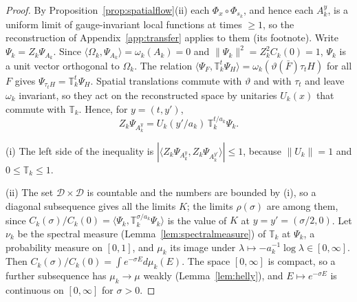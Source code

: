 \documentclass[aps,prd,twocolumn,superscriptaddress,nofootinbib,longbibliography,floatfix,amsmath,amssymb,10pt]{revtex4-2}
\theoremstyle{definition}
\theoremstyle{remark}
\newcommand{\ip}[2]{\langle #1,#2\rangle}
\begin{document}
\begin{proof}
By Proposition~\ref{prop:spatialflow}(ii) each $\Phi_x\circ\Phi_{s_k}$, and
hence each $A^y_k$, is a uniform limit of gauge-invariant local functions at
times $\ge1$, so the reconstruction of Appendix~\ref{app:transfer} applies to
them (its footnote). Write $\Psi_k=Z_k\Psi_{A_k}$. Since
$\ip{\Omega_k}{\Psi_{A_k}}=\omega_k(A_k)=0$ and $\|\Psi_k\|^2=Z_k^2C_k(0)=1$,
$\Psi_k$ is a unit vector orthogonal to $\Omega_k$. The relation
$\ip{\Psi_F}{\mathbb T_k^t\Psi_H}=\omega_k(\vartheta(\bar F)\tau_tH)$ for all $F$
gives $\Psi_{\tau_tH}=\mathbb T_k^t\Psi_H$. Spatial translations commute with
$\vartheta$ and with $\tau_t$ and leave $\omega_k$ invariant, so they act on the
reconstructed space by unitaries $U_k(x)$ that commute with $\mathbb T_k$.
Hence, for $y=(t,y')$,
\[
Z_k\Psi_{A^y_k}=U_k(y'/a_k)\,\mathbb T_k^{t/a_k}\Psi_k .
\]

(i) The left side of the inequality is $|\ip{Z_k\Psi_{A^y_k}}{Z_k
\Psi_{A^{y'}_k}}|\le1$, because $\|U_k\|=1$ and $0\le\mathbb T_k\le1$.

(ii) The set $\mathcal D\times\mathcal D$ is countable and the numbers are
bounded by (i), so a diagonal subsequence gives all the limits $K$; the limits
$\rho(\sigma)$ are among them, since $C_k(\sigma)/C_k(0)=
\ip{\Psi_k}{\mathbb T_k^{\sigma/a_k}\Psi_k}$ is the value of $K$ at
$y=y'=(\sigma/2,0)$. Let $\nu_k$ be the spectral measure (Lemma~\ref{lem:spectralmeasure}) of $\mathbb T_k$ at
$\Psi_k$, a probability measure on $[0,1]$, and $\mu_k$ its image under
$\lambda\mapsto-a_k^{-1}\log\lambda\in[0,\infty]$. Then
$C_k(\sigma)/C_k(0)=\int e^{-\sigma E}d\mu_k(E)$. The space $[0,\infty]$ is
compact, so a further subsequence has $\mu_k\to\mu$ weakly (Lemma~\ref{lem:helly}), and
$E\mapsto e^{-\sigma E}$ is continuous on $[0,\infty]$ for $\sigma>0$.


\end{proof}
\end{document}
